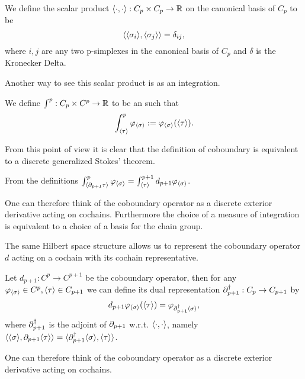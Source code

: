 \documentclass[../1.tex]{subfiles}
\begin{document}
    \begin{defn}
        We define the scalar product $\langle \cdot, \cdot \rangle : C_p \times C_p \to \mathbb{R}$ on the canonical basis of $C_p$ to be 
        \[ \langle \langle \sigma_i \rangle, \langle \sigma_j \rangle \rangle = \delta_{ij} ,\]  
        where $i,j$ are any two p-simplexes in the canonical basis of $C_p$ and $\delta$ is the Kronecker Delta.
    \end{defn}

    Another way to see this scalar product is as an integration.

    \begin{defn}
        We define $\int^p:C_p\times C^p\to\mathbb{R}$ to be an  such that
        \[ \int^{p}_{\langle \tau \rangle}\varphi_{\langle \sigma \rangle} := \varphi_{\langle \sigma \rangle}(\langle \tau \rangle).\]
    \end{defn}

    From this point of view it is clear that the definition of coboundary is equivalent to a discrete generalized Stokes' theorem.

    \begin{prop}
        From the definitions $\int^{p}_{\langle \partial_{p+1}\tau \rangle}\varphi_{\langle \sigma \rangle}=\int^{p+1}_{\langle \tau \rangle}d_{p+1}\varphi_{\langle \sigma \rangle}$.
    \end{prop}

    One can therefore think of the coboundary operator as a discrete exterior derivative acting on cochains. 
    Furthermore the choice of a measure of integration is equivalent to a choice of a basis for the chain group.

    The same Hilbert space structure allows us to represent the coboundary operator $d$ acting on a cochain with its cochain representative.

    \begin{defn}
        Let $d_{p+1} : C^p \to C^{p+1}$ be the coboundary operator, then for any \\ $\varphi_{\langle \sigma \rangle} \in C^p, \langle \tau \rangle \in C_{p+1}$ we can define its dual representation $\partial^\dagger_{p+1}:C_p \to C_{p+1}$ by
        \[d_{p+1}\varphi_{\langle \sigma \rangle}(\langle \tau \rangle) = \varphi_{\partial^\dagger_{p+1}\langle \sigma \rangle},\]
        where $\partial_{p+1}^\dagger$ is the adjoint of $\partial_{p+1}$ w.r.t. $\langle \cdot, \cdot \rangle$, 
        namely $\langle \langle \sigma \rangle, \partial_{p+1}\langle \tau \rangle \rangle = \langle \partial^\dagger_{p+1} \langle \sigma \rangle, \langle \tau \rangle \rangle$.
    \end{defn}

    One can therefore think of the coboundary operator as a discrete exterior derivative acting on cochains.
\end{document}

